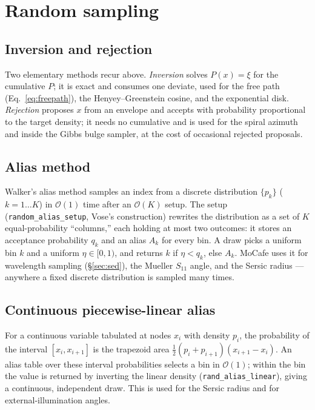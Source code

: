 \documentclass[english,a4paper]{kiseon_memo}
\newcommand{\code}[1]{\texttt{#1}}
\begin{document}
\section{Random sampling}\label{sec:alias}

\subsection{Inversion and rejection}
Two elementary methods recur above.  \emph{Inversion} solves $P(x)=\xi$ for the
cumulative $P$; it is exact and consumes one deviate, used for the free path
(Eq.~\ref{eq:freepath}), the Henyey--Greenstein cosine, and the exponential
disk.  \emph{Rejection} proposes $x$ from an envelope and accepts with
probability proportional to the target density; it needs no cumulative and is
used for the spiral azimuth and inside the Gibbs bulge sampler, at the cost of
occasional rejected proposals.

\subsection{Alias method}
Walker's alias method samples an index from a discrete distribution $\{p_k\}$
($k=1\ldots K$) in $\mathcal O(1)$ time after an $\mathcal O(K)$ setup.  The
setup (\code{random\_alias\_setup}, Vose's construction) rewrites the
distribution as a set of $K$ equal-probability ``columns,'' each holding at most
two outcomes: it stores an acceptance probability $q_k$ and an alias $A_k$ for
every bin.  A draw picks a uniform bin $k$ and a uniform $\eta\in[0,1)$, and
returns $k$ if $\eta<q_k$, else $A_k$.  MoCafe uses it for wavelength sampling
(\S\ref{sec:sed}), the Mueller $S_{11}$ angle, and the Sersic radius --- anywhere
a fixed discrete distribution is sampled many times.

\subsection{Continuous piecewise-linear alias}
For a continuous variable tabulated at nodes $x_i$ with density $p_i$, the
probability of the interval $[x_i,x_{i+1}]$ is the trapezoid area
$\tfrac12(p_i+p_{i+1})(x_{i+1}-x_i)$.  An alias table over these interval
probabilities selects a bin in $\mathcal O(1)$; within the bin the value is
returned by inverting the linear density (\code{rand\_alias\_linear}), giving a
continuous, independent draw.  This is used for the Sersic radius and for
external-illumination angles.
\end{document}

